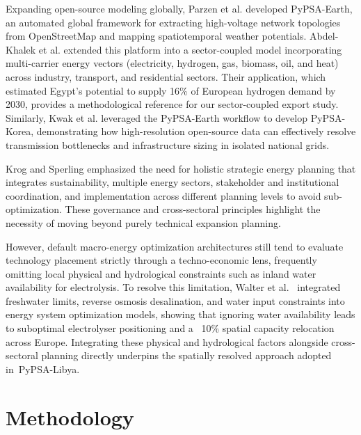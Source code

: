 \documentclass[preprint,12pt]{elsarticle}
\begin{document}
Expanding open-source modeling globally, Parzen et al. \cite{parzen2023pypsa} developed \textsf{PyPSA-Earth}, an automated global framework for extracting high-voltage network topologies from OpenStreetMap and mapping spatiotemporal weather potentials. Abdel-Khalek et al. \cite{abdelkhalek2025pypsa} extended this platform into a sector-coupled model incorporating multi-carrier energy vectors (electricity, hydrogen, gas, biomass, oil, and heat) across industry, transport, and residential sectors. Their application, which estimated Egypt's potential to supply 16\% of European hydrogen demand by 2030, provides a methodological reference for our sector-coupled export study. Similarly, Kwak et al. \cite{kwak2025pypsa} leveraged the \textsf{PyPSA-Earth} workflow to develop \textsf{PyPSA-Korea}, demonstrating how high-resolution open-source data can effectively resolve transmission bottlenecks and infrastructure sizing in isolated national grids.

Krog and Sperling \cite{krog2019comprehensive} emphasized the need for holistic strategic energy planning that integrates sustainability, multiple energy sectors, stakeholder and institutional coordination, and implementation across different planning levels to avoid sub-optimization. These governance and cross-sectoral principles highlight the necessity of moving beyond purely technical expansion planning.

However, default macro-energy optimization architectures still tend to evaluate technology placement strictly through a techno-economic lens, frequently omitting local physical and hydrological constraints such as inland water availability for electrolysis. To resolve this limitation, Walter et al.~\cite{walter2025integrating} integrated freshwater limits, reverse osmosis desalination, and water input constraints into energy system optimization models, showing that ignoring water availability leads to suboptimal electrolyser positioning and a ~10\% spatial capacity relocation across Europe. Integrating these physical and hydrological factors alongside cross-sectoral planning directly underpins the spatially resolved approach adopted in~\textsf{PyPSA-Libya}.


\section{Methodology}
\label{sec:methodology}
\end{document}
